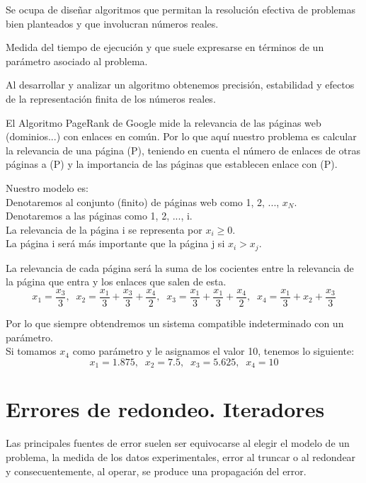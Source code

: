 \begin{ndef}
Se ocupa de diseñar algoritmos que permitan la resolución efectiva de problemas bien planteados y que involucran números reales.
\end{ndef}

\begin{ndef}
Medida del tiempo de ejecución y que suele expresarse en términos de un parámetro asociado al problema.
\end{ndef}

Al desarrollar y analizar un algoritmo obtenemos precisión, estabilidad y efectos de la representación finita de los números reales.

El Algoritmo PageRank de Google mide la relevancia de las páginas web (dominios...) con enlaces en común. Por lo que aquí nuestro problema es calcular la relevancia de una página (P), teniendo en cuenta el número de enlaces de otras páginas a (P) y la importancia de las páginas que establecen enlace con (P).

Nuestro modelo es:\\
Denotaremos al conjunto (finito) de páginas web como 1, 2, ..., $x_N$.\\
Denotaremos a las páginas como 1, 2, ..., i.\\
La relevancia de la página i se representa por $x_i \geq 0$.\\
La página i será más importante que la página j si $x_i > x_j$.

\begin{ejemplo}
La relevancia de cada página será la suma de los cocientes entre la relevancia de la página que entra y los enlaces que salen de esta.
\[ x_1 = \frac{x_3}{3}, \; \; x_2 = \frac{x_1}{3} + \frac{x_3}{3} + \frac{x_4}{2}, \; \; x_3 = \frac{x_1}{3} + \frac{x_1}{3} + \frac{x_4}{2}, \; \; x_4 = \frac{x_1}{3} + x_2 + \frac{x_3}{3} \]

Por lo que siempre obtendremos un sistema compatible indeterminado con un parámetro.\\

Si tomamos $x_4$ como parámetro y le asignamos el valor 10, tenemos lo siguiente:
\[ x_1 = 1.875, \; \; x_2 = 7.5, \; \; x_3 = 5.625, \; \; x_4 = 10 \]
\end{ejemplo}

\section{Errores de redondeo. Iteradores}
Las principales fuentes de error suelen ser equivocarse al elegir el modelo de un problema, la medida de los datos experimentales, error al truncar o al redondear y consecuentemente, al operar, se produce una propagación del error.

